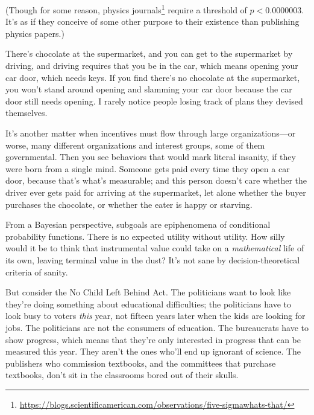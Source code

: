 { (Though for some reason, physics journals\footnote{\url{https://blogs.scientificamerican.com/observations/five-sigmawhats-that/}} require a threshold of $p < 0.0000003$. It's as if they conceive of some
other purpose to their existence than publishing physics papers.)


 There's chocolate at the supermarket, and you can
get to the supermarket by driving, and driving requires that you be in
the car, which means opening your car door, which needs keys. If you
find there's no chocolate at the supermarket, you
won't stand around opening and slamming your car door
because the car door still needs opening. I rarely notice people losing
track of plans they devised themselves.


 It's another matter when incentives must flow
through large organizations---or worse, many different organizations
and interest groups, some of them governmental. Then you see behaviors
that would mark literal insanity, if they were born from a single mind.
Someone gets paid every time they open a car door, because
that's what's measurable; and this
person doesn't care whether the driver ever gets paid
for arriving at the supermarket, let alone whether the buyer purchases
the chocolate, or whether the eater is happy or starving.


 From a Bayesian perspective, subgoals are epiphenomena of
conditional probability functions. There is no expected utility without
utility. How silly would it be to think that instrumental value could
take on a \textit{mathematical} life of its own, leaving terminal value
in the dust? It's not sane by decision-theoretical
criteria of sanity.


 But consider the No Child Left Behind Act. The politicians want to
look like they're doing something about educational
difficulties; the politicians have to look busy to voters \textit{this}
year, not fifteen years later when the kids are looking for jobs. The
politicians are not the consumers of education. The bureaucrats have to
show progress, which means that they're only interested
in progress that can be measured this year. They aren't
the ones who'll end up ignorant of science. The
publishers who commission textbooks, and the committees that purchase
textbooks, don't sit in the classrooms bored out of
their skulls.


}
